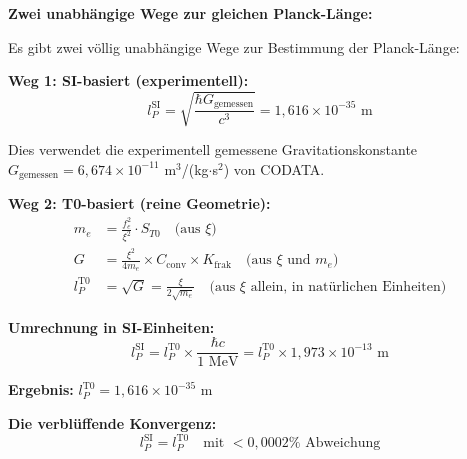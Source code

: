 \documentclass[12pt,a4paper]{article}
\begin{document}
	\begin{historical}
		\textbf{Zwei unabh{\"a}ngige Wege zur gleichen Planck-L{\"a}nge:}
		
		Es gibt zwei v{\"o}llig unabh{\"a}ngige Wege zur Bestimmung der Planck-L{\"a}nge:
		
		\textbf{Weg 1: SI-basiert (experimentell):}
		\begin{equation}
			l_P^{\text{SI}} = \sqrt{\frac{\hbar G_{\text{gemessen}}}{c^3}} = 1{,}616 \times 10^{-35} \text{ m}
		\end{equation}
		
		Dies verwendet die experimentell gemessene Gravitationskonstante $G_{\text{gemessen}} = 6{,}674 \times 10^{-11}$ m$^3$/(kg$\cdot$s$^2$) von CODATA.
		
		\textbf{Weg 2: T0-basiert (reine Geometrie):}
		\begin{align}
			m_e &= \frac{f_e^2}{\xi^2} \cdot S_{T0} \quad \text{(aus } \xi\text{)} \\
			G &= \frac{\xi^2}{4m_e} \times C_{\text{conv}} \times K_{\text{frak}} \quad \text{(aus } \xi \text{ und } m_e\text{)} \\
			l_P^{\text{T0}} &= \sqrt{G} = \frac{\xi}{2\sqrt{m_e}} \quad \text{(aus } \xi \text{ allein, in nat{\"u}rlichen Einheiten)}
		\end{align}
		
		\textbf{Umrechnung in SI-Einheiten:}
		\begin{equation}
			l_P^{\text{SI}} = l_P^{\text{T0}} \times \frac{\hbar c}{1 \text{ MeV}} = l_P^{\text{T0}} \times 1{,}973 \times 10^{-13} \text{ m}
		\end{equation}
		
		\textbf{Ergebnis:} $l_P^{\text{T0}} = 1{,}616 \times 10^{-35}$ m
		
		\textbf{Die verbl{\"u}ffende Konvergenz:}
		\begin{equation}
			\boxed{l_P^{\text{SI}} = l_P^{\text{T0}} \quad \text{mit } <0{,}0002\% \text{ Abweichung}}
		\end{equation}
	\end{historical}
	
\end{document}
